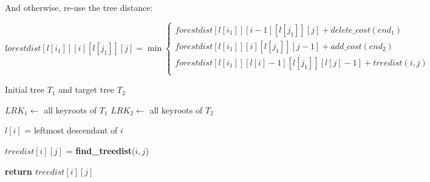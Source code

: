 And otherwise, re-use the tree distance: 

$\mathrm forestdist[l[i_1]][i][l[j_1]][j] =
\min\begin{cases}
    \mathrm{}forestdist[l[i_1]][i-1][l[j_1]][j] + delete\_cost(end_1) \\
    \mathrm{}forestdist[l[i_1]][i][l[j_1]][j-1] + add\_cost(end_2) \\
    \mathrm{}forestdist[l[i_1]][l[i]-1][l[j_1]][l[j]-1] +  treedist(i,j) \\
\end{cases}$%

\begin{algorithm}
\caption{The Zhang-Shasha Algorithm}
\begin{algorithmic}[1]
\Require Initial tree $T_1$ and target tree $T_2$

\State $LRK_1 \leftarrow $ all keyroots of $T_1$
\State $LRK_2 \leftarrow $ all keyroots of $T_2$

    \State $l[i]$ = leftmost descendant of $i$
\EndFor

        \State $treedist[i][j]$ = \textbf{find\_treedist}($i,j$) 
    \EndFor
\EndFor

\State \bf{return} $treedist[i][j]$
\end{algorithmic}
\end{algorithm}

